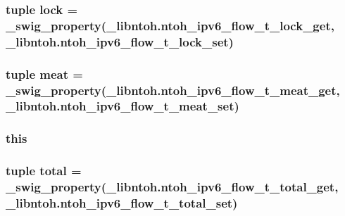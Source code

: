 \hypertarget{classlibntoh_1_1ntoh__ipv6__flow__t_a871c7bf899334194698c2a3bced5e064}{
\subsubsection[{lock}]{\setlength{\rightskip}{0pt plus 5cm}tuple lock = {\bf \-\_\-swig\-\_\-property}(\-\_\-libntoh.\-ntoh\-\_\-ipv6\-\_\-flow\-\_\-t\-\_\-lock\-\_\-get, \-\_\-libntoh.\-ntoh\-\_\-ipv6\-\_\-flow\-\_\-t\-\_\-lock\-\_\-set)\hspace{0.3cm}{\ttfamily [static]}}}\label{classlibntoh_1_1ntoh__ipv6__flow__t_a871c7bf899334194698c2a3bced5e064}
\hypertarget{classlibntoh_1_1ntoh__ipv6__flow__t_a05f7a909b2438fcd11159037a9b76457}{
\subsubsection[{meat}]{\setlength{\rightskip}{0pt plus 5cm}tuple meat = {\bf \-\_\-swig\-\_\-property}(\-\_\-libntoh.\-ntoh\-\_\-ipv6\-\_\-flow\-\_\-t\-\_\-meat\-\_\-get, \-\_\-libntoh.\-ntoh\-\_\-ipv6\-\_\-flow\-\_\-t\-\_\-meat\-\_\-set)\hspace{0.3cm}{\ttfamily [static]}}}\label{classlibntoh_1_1ntoh__ipv6__flow__t_a05f7a909b2438fcd11159037a9b76457}
\hypertarget{classlibntoh_1_1ntoh__ipv6__flow__t_a05c09a5e9d53fa7adf0a7936038c2fa3}{
\subsubsection[{this}]{\setlength{\rightskip}{0pt plus 5cm}this}}\label{classlibntoh_1_1ntoh__ipv6__flow__t_a05c09a5e9d53fa7adf0a7936038c2fa3}
\hypertarget{classlibntoh_1_1ntoh__ipv6__flow__t_a707ba789fae19e34fbeeca4da8c30c5f}{
\subsubsection[{total}]{\setlength{\rightskip}{0pt plus 5cm}tuple total = {\bf \-\_\-swig\-\_\-property}(\-\_\-libntoh.\-ntoh\-\_\-ipv6\-\_\-flow\-\_\-t\-\_\-total\-\_\-get, \-\_\-libntoh.\-ntoh\-\_\-ipv6\-\_\-flow\-\_\-t\-\_\-total\-\_\-set)\hspace{0.3cm}{\ttfamily [static]}}}\label{classlibntoh_1_1ntoh__ipv6__flow__t_a707ba789fae19e34fbeeca4da8c30c5f}
